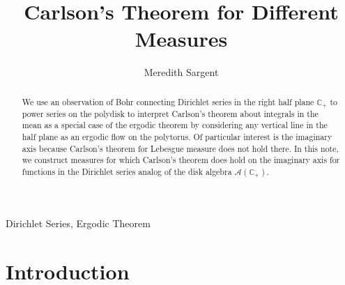 \documentclass[]{elsarticle}
\numberwithin{equation}{section}
\begin{document}

\begin{frontmatter}

\title{Carlson's Theorem for Different Measures}



\author[mymainaddress]{Meredith Sargent}

\address[mymainaddress]{Department of Mathematics, Campus Box 1146, Washington University in St Louis, St Louis, MO 63130}

\begin{abstract}
We use an observation of Bohr connecting Dirichlet series in the right half plane $\mathbb{C}_+$ to power series on the polydisk to interpret Carlson's theorem about integrals in the mean as a special case of the ergodic theorem by considering any vertical line in the half plane as an ergodic flow on the polytorus. Of particular interest is the imaginary axis because Carlson's theorem for Lebesgue measure does not hold there. In this note, we construct measures for which Carlson's theorem does hold on the imaginary axis for functions in the Dirichlet series analog of the disk algebra $\mathcal{A}(\mathbb{C}_+)$.
\end{abstract}

\begin{keyword}
Dirichlet Series, Ergodic Theorem
\end{keyword}

\end{frontmatter}

\section{Introduction} %
\label{sec:introduction}
\end{document}
